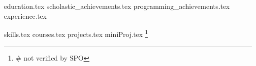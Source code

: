 \documentclass[11pt, a4paper]{awesome-cv}
\newcommand*{\sectiondir}{resume/}
\begin{document}
\makecvheader

{education.tex}
{scholastic_achievements.tex}
{programming_achievements.tex}
{experience.tex}

{skills.tex}
{courses.tex}
{projects.tex}
{miniProj.tex}
\footnote{\# not verified by SPO}
\end{document}
